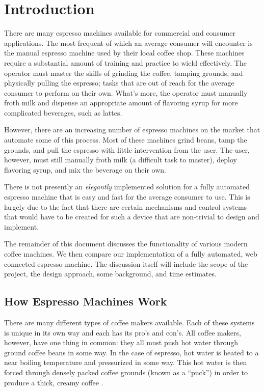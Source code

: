 \documentclass[conference]{IEEEtran}
\begin{document}
%
\section{Introduction} 

There are many espresso machines available for commercial and
consumer applications. The most frequent of which an average consumer will
encounter is the manual espresso machine used by their local coffee shop. These
machines require a substantial amount of training and practice to wield
effectively. The operator must master the skills of grinding the coffee, tamping
grounds, and physically pulling the espresso; tasks that are out of reach for
the average consumer to perform on their own. What's more, the operator must
manually froth milk and dispense an appropriate amount of flavoring syrup for more
complicated beverages, such as lattes.

However, there are an increasing number of espresso machines on the market that
automate some of this process.  Most of these machines grind beans, tamp the
grounds, and pull the espresso with little intervention from the user. The user,
however, must still manually froth milk (a difficult task to master), deploy
flavoring syrup, and mix the beverage on their own.
 
There is not presently an \emph{elegantly} implemented solution for a fully
automated espresso machine that is easy and fast for the average consumer
to use. This is largely due to the fact that there are certain mechanisms and
control systems that would have to be created for such a device that are
non-trivial to design and implement.

The remainder of this document discusses the functionality of various 
modern coffee machines. We then compare our implementation of a fully
automated, web connected espresso machine. The discussion itself will
include the scope of the project, the design approach, some background, 
and time estimates. 

\subsection{How Espresso Machines Work}

There are many different types of coffee makers available. Each of these systems
is unique in its own way and each has its pro's and con's. All coffee makers,
however, have one thing in common: they all must push hot water through ground
coffee beans in some way. In the case of espresso, hot water is heated to a near
boiling temperature and pressurized in some way. This hot water is then forced
through densely packed coffee grounds (known as a ``puck'') in order to produce
a thick, creamy coffee \cite{wikiespresso}.  
\end{document}
